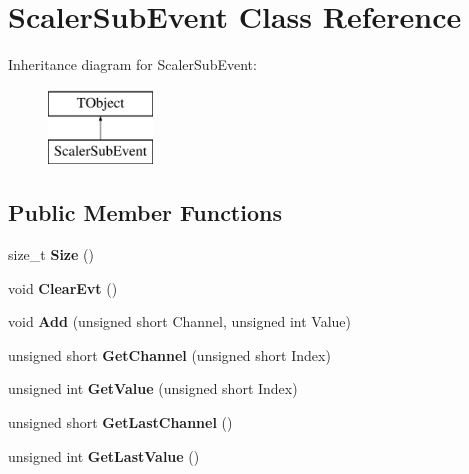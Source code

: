 \hypertarget{class_scaler_sub_event}{}\section{Scaler\+Sub\+Event Class Reference}
\label{class_scaler_sub_event}
Inheritance diagram for Scaler\+Sub\+Event\+:\begin{figure}[H]
\begin{center}
\leavevmode
\includegraphics[height=2.000000cm]{class_scaler_sub_event}
\end{center}
\end{figure}
\subsection*{Public Member Functions}
\begin{DoxyCompactItemize}
\item 
\mbox{\label{class_scaler_sub_event_a5db34a3f53c89bad6d9a961132cad259}} 
size\+\_\+t {\bfseries Size} ()
\item 
\mbox{\label{class_scaler_sub_event_abd5effab974e0d49409556603e614c5a}} 
void {\bfseries Clear\+Evt} ()
\item 
\mbox{\label{class_scaler_sub_event_a4958f75ee49941fece531ac3924fe2e3}} 
void {\bfseries Add} (unsigned short Channel, unsigned int Value)
\item 
\mbox{\label{class_scaler_sub_event_ab728020f4bffbf31be733bd14be29884}} 
unsigned short {\bfseries Get\+Channel} (unsigned short Index)
\item 
\mbox{\label{class_scaler_sub_event_ac47b65fbb194003c8183db5a1a277f5d}} 
unsigned int {\bfseries Get\+Value} (unsigned short Index)
\item 
\mbox{\label{class_scaler_sub_event_a3731af3cd6dbb0063051fb9a309d9c44}} 
unsigned short {\bfseries Get\+Last\+Channel} ()
\item 
\mbox{\label{class_scaler_sub_event_a9cebf7678667cbd4a8976b4544df7a1d}} 
unsigned int {\bfseries Get\+Last\+Value} ()
\end{DoxyCompactItemize}
